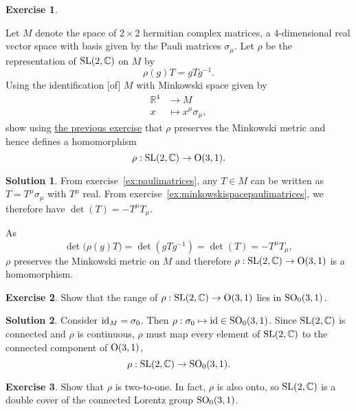 \documentclass[11pt, a4paper]{report}
\theoremstyle{definition}
\newtheorem{exercise}{Exercise}[part]
\newtheorem{solution}{Solution}[part]
\newenvironment{ex}{\begin{exercise}}{\end{exercise}\pagebreak[1]}
\newenvironment{sol}{\begin{solution}}{\end{solution}\pagebreak[3]}
\newcommand*{\SL}{\ensuremath\text{SL}}
\renewcommand*{\O}{\ensuremath\text{O}}
\newcommand*{\SO}{\ensuremath\text{SO}}
\newcommand*{\id}{\ensuremath\mathop{}\mathopen{}\mathrm{id}}
\begin{document}
\begin{ex}\label{ex:slrepresentation}

Let $M$ denote the space of $2 \times 2$ hermitian complex matrices, a 4-dimensional real vector space with basis given by the Pauli matrices $\sigma_\mu$.
Let $\rho$ be the representation of $\SL(2, \mathbb{C})$ on $M$ by
\[
    \rho(g) T = g T g^{-1}.
\]
Using the identification [of] $M$ with Minkowski space given by
\begin{align*}
    \mathbb{R}^4 &\to M \\
    x            &\mapsto x^\mu \sigma_\mu,
\end{align*}
show using \hyperref[ex:minkowskispacepaulimatrices]{the previous exercise} that $\rho$ preserves the Minkowski metric and hence defines a homomorphism
\[
    \rho: \SL(2, \mathbb{C}) \to \O(3, 1).
\]

\end{ex}

\begin{sol}

From exercise~\ref{ex:paulimatrices}, any $T \in M$ can be written as $T = T^\mu \sigma_\mu$ with $T^\mu$ real.
From exercise~\ref{ex:minkowskispacepaulimatrices}, we therefore have $\det(T) = -T^\mu T_\mu$.

As
\[
    \det\bigl( \rho(g) T \bigr) = \det(g T g^{-1}) = \det(T) = -T^\mu T_\mu,
\]
$\rho$ preserves the Minkowski metric on $M$ and therefore $\rho: \SL(2, \mathbb{C}) \to \O(3, 1)$ is a homomorphism.

\end{sol}

\begin{ex}

Show that the range of $\rho: \SL(2, \mathbb{C}) \to \O(3, 1)$ lies in $\SO_0(3, 1)$.

\end{ex}

\begin{sol}

Consider $\id_M = \sigma_0$. Then $\rho: \sigma_0 \mapsto \id \in \SO_0(3, 1)$.
Since $\SL(2, \mathbb{C})$ is connected and $\rho$ is continuous, $\rho$ must map every element of $\SL(2, \mathbb{C})$ to the connected component of $\O(3, 1)$,
\[
    \rho: \SL(2, \mathbb{C}) \to \SO_0(3, 1).
\]

\end{sol}

\begin{ex}

Show that $\rho$ is two-to-one. In fact, $\rho$ is also onto, so $\SL(2, \mathbb{C})$ is a double cover of the connected Lorentz group $\SO_0(3, 1)$.

\end{ex}
\end{document}

